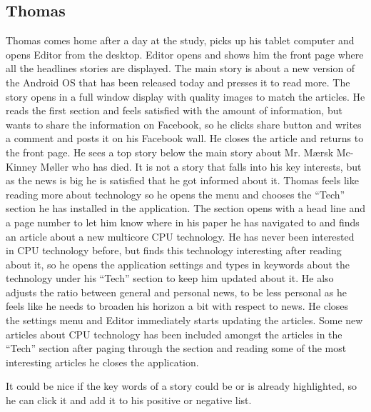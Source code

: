 \subsection{Thomas}
Thomas comes home after a day at the study, picks up his tablet computer and opens Editor from the desktop. Editor opens and shows him the front page where all the headlines stories are displayed. The main story is about a new version of the Android OS that has been released today and presses it to read more. The story opens in a full window display with quality images to match the articles. He reads the first section and feels satisfied with the amount of information, but wants to share the information on Facebook, so he clicks share button and writes a comment and posts it on his Facebook wall. He closes the article and returns to the front page. He sees a top story below the main story about Mr. Mærsk Mc-Kinney Møller who has died. It is not a story that falls into his key interests, but as the news is big he is satisfied that he got informed about it. Thomas feels like reading more about technology so he opens the menu and chooses the ``Tech'' section he has installed in the application. The section opens with a head line and a page number to let him know where in his paper he has navigated to and finds an article about a new multicore CPU technology. He has never been interested in CPU technology before, but finds this technology interesting after reading about it, so he opens the application settings and types in keywords about the technology under his ``Tech'' section to keep him updated about it. He also adjusts the ratio between general and personal news, to be less personal as he feels like he needs to broaden his horizon a bit with respect to news. He closes the settings menu and Editor immediately starts updating the articles. Some new articles about CPU technology has been included amongst the articles in the ``Tech'' section after paging through the section and reading some of the most interesting articles he closes the application.

It could be nice if the key words of a story could be or is already highlighted, so he can click it and add it to his positive or negative list.

